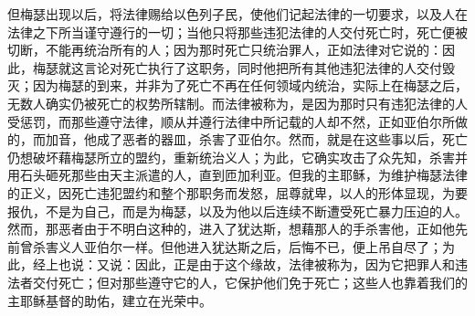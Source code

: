 但梅瑟出现以后，将法律赐给以色列子民，使他们记起法律的一切要求，以及人在法律之下所当谨守遵行的一切；当他只将那些违犯法律的人交付死亡时，死亡便被切断，不能再统治所有的人；因为那时死亡只统治罪人，正如法律对它说的：因此，梅瑟就这言论对死亡执行了这职务，同时他把所有其他违犯法律的人交付毁灭；因为梅瑟的到来，并非为了死亡不再在任何领域内统治，实际上在梅瑟之后，无数人确实仍被死亡的权势所辖制。而法律被称为，是因为那时只有违犯法律的人受惩罚，而那些遵守法律，顺从并遵行法律中所记载的人却不然，正如亚伯尔所做的，而加音，他成了恶者的器皿，杀害了亚伯尔。然而，就是在这些事以后，死亡仍想破坏藉梅瑟所立的盟约，重新统治义人；为此，它确实攻击了众先知，杀害并用石头砸死那些由天主派遣的人，直到匝加利亚。但我的主耶稣，为维护梅瑟法律的正义，因死亡违犯盟约和整个那职务而发怒，屈尊就卑，以人的形体显现，为要报仇，不是为自己，而是为梅瑟，以及为他以后连续不断遭受死亡暴力压迫的人。然而，那恶者由于不明白这种的，进入了犹达斯，想藉那人的手杀害他，正如他先前曾杀害义人亚伯尔一样。但他进入犹达斯之后，后悔不已，便上吊自尽了；为此，经上也说：又说：因此，正是由于这个缘故，法律被称为，因为它把罪人和违法者交付死亡；但对那些遵守它的人，它保护他们免于死亡；这些人也靠着我们的主耶稣基督的助佑，建立在光荣中。\par

